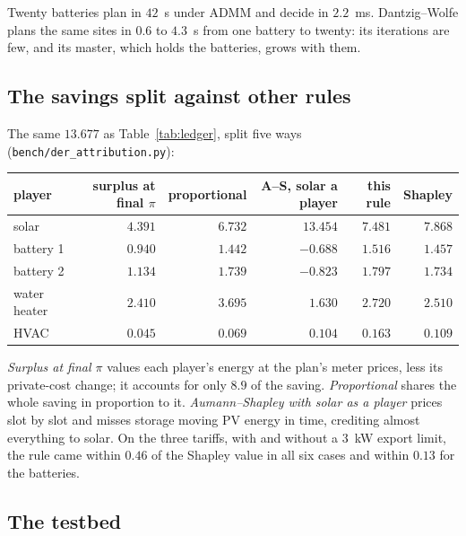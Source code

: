 \documentclass[11pt,a4paper]{article}
\begin{document}
Twenty batteries plan in $42$~s under ADMM and decide in $2.2$~ms. Dantzig--Wolfe
plans the same sites in $0.6$ to $4.3$~s from one battery to twenty: its
iterations are few, and its master, which holds the batteries, grows with them.

\subsection{The savings split against other rules}
\label{app:ledger}

The same $13.677$ as Table~\ref{tab:ledger}, split five ways
(\texttt{bench/der\_attribution.py}):
\begin{center}
\small
\begin{tabular}{lrrrrr}
\toprule
player & surplus at final $\pi$ & proportional & A--S, solar a player & this rule & Shapley \\
\midrule
solar        & $4.391$ & $6.732$ & $13.454$ & $7.481$ & $7.868$ \\
battery 1    & $0.940$ & $1.442$ & $-0.688$ & $1.516$ & $1.457$ \\
battery 2    & $1.134$ & $1.739$ & $-0.823$ & $1.797$ & $1.734$ \\
water heater & $2.410$ & $3.695$ & $1.630$ & $2.720$ & $2.510$ \\
HVAC         & $0.045$ & $0.069$ & $0.104$ & $0.163$ & $0.109$ \\
\bottomrule
\end{tabular}
\end{center}
\emph{Surplus at final $\pi$} values each player's energy at the plan's meter
prices, less its private-cost change; it accounts for only $8.9$ of the saving.
\emph{Proportional} shares the whole saving in proportion to it.
\emph{Aumann--Shapley with solar as a player} prices slot by slot and misses
storage moving PV energy in time, crediting almost everything to solar. On the
three tariffs, with and without a $3$~kW export limit, the rule came within $0.46$
of the Shapley value in all six cases and within $0.13$ for the batteries.

\subsection{The testbed}
\end{document}
